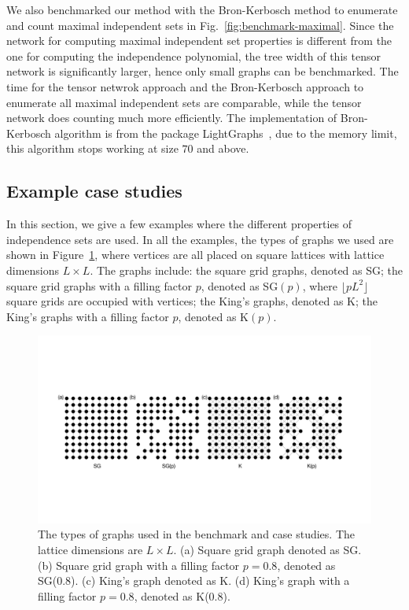 \documentclass[onefignum, onetabnum]{siamart190516}
\newcommand{\<}{\langle}
\renewcommand{\>}{\rangle}
\newcommand{\Fig}[1]{Fig.~\ref{#1}}
\newcounter{example}
\begin{document}
We also benchmarked our method with the Bron-Kerbosch method to enumerate and count maximal independent sets in \Fig{fig:benchmark-maximal}.
Since the network for computing maximal independent set properties is different from the one for computing the independence polynomial,
the tree width of this tensor network is significantly larger, hence only small graphs can be benchmarked.
The time for the tensor netwrok approach and the Bron-Kerbosch approach to enumerate all maximal independent sets are comparable,
while the tensor network does counting much more efficiently.
The implementation of Bron-Kerbosch algorithm is from the package LightGraphs~\cite{LightGraphs},
due to the memory limit, this algorithm stops working at size $70$ and above.

\subsection{Example case studies} In this section, we give a few examples where the different properties of independence sets are used.
In all the examples, the types of graphs we used are shown in Figure~\ref{fig:lattices}, where vertices are all placed on square lattices with lattice dimensions $L \times L$.
The graphs include: the square grid graphs, denoted as SG; the square grid graphs with a filling factor $p$, denoted as SG$(p)$, where $\lfloor pL^{2} \rfloor$ square grids are occupied with vertices;
the King's graphs, denoted as K; the King's graphs with a filling factor $p$, denoted as K$(p)$. 

\begin{figure}[t] 
    \centering
    \includegraphics[width=\textwidth, trim={0cm 0cm 0cm 0cm}, clip]{lattices.pdf}
    \caption{The types of graphs used in the benchmark and case studies.
    The lattice dimensions are $L\times L$. (a) Square grid graph denoted as SG. (b) Square grid graph with a filling factor $p=0.8$, denoted as SG(0.8).
    (c) King's graph denoted as K. (d) King's graph with a filling factor $p=0.8$, denoted as K(0.8).}
    \label{fig:lattices}
\end{figure}
\end{document}
